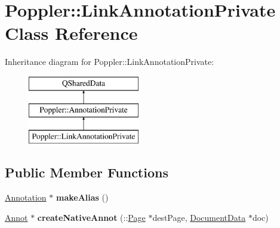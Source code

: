 \hypertarget{class_poppler_1_1_link_annotation_private}{}\section{Poppler\+:\+:Link\+Annotation\+Private Class Reference}
\label{class_poppler_1_1_link_annotation_private}
Inheritance diagram for Poppler\+:\+:Link\+Annotation\+Private\+:\begin{figure}[H]
\begin{center}
\leavevmode
\includegraphics[height=3.000000cm]{class_poppler_1_1_link_annotation_private}
\end{center}
\end{figure}
\subsection*{Public Member Functions}
\begin{DoxyCompactItemize}
\item 
\mbox{\label{class_poppler_1_1_link_annotation_private_a717a13c045ea47494fe5704101e80fc7}} 
\hyperlink{class_poppler_1_1_annotation}{Annotation} $\ast$ {\bfseries make\+Alias} ()
\item 
\mbox{\label{class_poppler_1_1_link_annotation_private_af3deb7773838c3159734b4e25b426a08}} 
\hyperlink{class_annot}{Annot} $\ast$ {\bfseries create\+Native\+Annot} (\+::\hyperlink{class_poppler_1_1_page}{Page} $\ast$dest\+Page, \hyperlink{class_poppler_1_1_document_data}{Document\+Data} $\ast$doc)
\end{DoxyCompactItemize}
